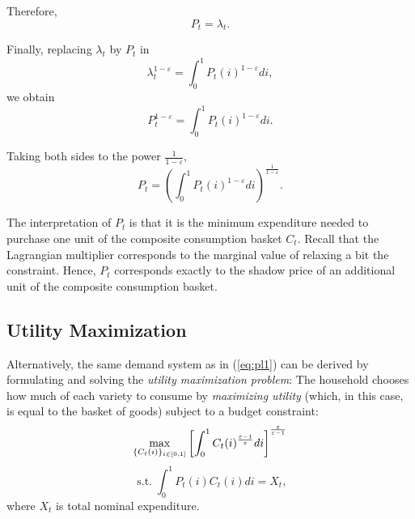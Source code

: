 \documentclass[dvipsnames,11pt]{article}
\begin{document}
\begin{enumerate}
\begin{solution}
Therefore,
\[
P_t=\lambda_t.
\]

Finally, replacing \(\lambda_t\) by \(P_t\) in
\[
\lambda_t^{1-\varepsilon}=\int_0^1 P_t(i)^{1-\varepsilon}di,
\]
we obtain
\[
P_t^{1-\varepsilon}=\int_0^1 P_t(i)^{1-\varepsilon}di.
\]

Taking both sides to the power \(\frac{1}{1-\varepsilon}\),
\[
P_t=
\left(\int_0^1 P_t(i)^{1-\varepsilon}di\right)^{\frac{1}{1-\varepsilon}}
.
\]

The interpretation of \(P_t\) is that it is the minimum expenditure needed to purchase one unit of the composite consumption basket \(C_t\). Recall that the Lagrangian multiplier corresponds to the marginal value of relaxing a bit the constraint. Hence, $P_t$ corresponds exactly to the shadow price of an additional unit of the composite consumption basket.

\end{solution}
    
        \end{enumerate}

    \subsection{Utility Maximization}

        Alternatively, the same demand system as in (\ref{eq:pl1}) can be derived by formulating and solving the \textit{utility maximization problem}: The household chooses how much of each variety to consume by \textit{maximizing utility} (which, in this case, is equal to the basket of goods) subject to a budget constraint:
        \begin{equation*}
        \underset{\{C_{t}(i)\}_{i\in [0,1]}}{\max }\left[ \int_{0}^{1}C_{t}(i)^{\frac{\varepsilon -1}{%
        \varepsilon }}di\right] ^{\frac{\varepsilon }{\varepsilon -1}}
        \end{equation*}
        \begin{equation*}
        \text{ s.t.}\;\int_{0}^{1}P_{t}(i)C_{t}(i)di=X_{t},
        \end{equation*}
        where $X_{t}$ is total nominal expenditure.
\end{document}
